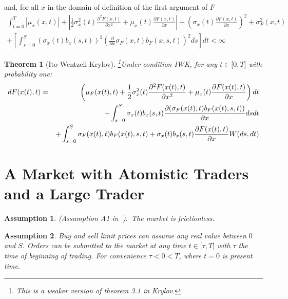 \documentclass{article}
\newtheorem{theorem}{Theorem}[section]
\newtheorem{assumption}{Assumption}
\begin{document}
\qquad and, for all $x$ in the domain of definition of the first argument of
$F$%
\begin{gather*}
\int_{t=0}^{T}|\mu _{x}(x,t)|+\left|\frac{1}{2}\sigma _{x}^{2}(t)\frac{\partial
^{2}F(x,t)}{\partial x^{2}}+\mu _{x}(t)\frac{\partial F(x,t)}{\partial x}%
\right|+\left( \sigma _{x}(t)\frac{\partial F(x,t)}{\partial x}\right) ^{2}+\sigma
_{F}^{2}(x,t) \\
+\left[\int_{s=0}^{S}(\sigma_{x}(t)b_{x}(s,t))^{2}\left(\frac{\partial }{\partial x}%
\sigma _{F}(x,t)b_{F}(x,s,t)\right)^{2}ds\right]dt<\infty
\end{gather*}


\begin{theorem}[Ito-Wentzell-Krylov]
\footnote{%
This is a weaker version of theorem 3.1 in Krylov.}Under condition IWK, for
any $t\in \lbrack 0,T]$ with probability one:%
\begin{eqnarray}
dF(x(t),t) &=&\left( \mu _{F}(x(t),t)+\frac{1}{2}\sigma _{x}^{2}(t)\frac{%
\partial ^{2}F(x(t),t)}{\partial x^{2}}+\mu _{x}(t)\frac{\partial F(x(t),t)}{%
\partial x}\right) dt  \label{ItoWentzell} \\
&&+\int_{s=0}^{S}\sigma _{x}(t)b_{x}(s,t)\frac{\partial (\sigma
_{F}(x(t),t)b_{F}(x(t),s,t))}{\partial x}dsdt  \notag \\
&&+\int_{s=0}^{S}\sigma _{F}(x(t),t)b_{F}(x(t),s,t)+\sigma _{x}(t)b_{x}(s,t)%
\frac{\partial F(x(t),t)}{\partial x}W(ds,dt)  \notag
\end{eqnarray}
\end{theorem}

\section{A Market with Atomistic Traders and a Large Trader}


\begin{assumption}
\label{ass::market_frictionless} (Assumption A1 in\textbf{\ }\cite{Jar92}).\
The market is frictionless.
\end{assumption}



\begin{assumption}
Buy and sell limit prices can assume any real value between $0$ and $S$.
Orders can be submitted to the market at any time $t\in \mathbb{[\tau },T]$
with $\tau $ the time of beginning of trading. For convenience $\tau <0<T$,
where $t=0$ is present time.
\end{assumption}
\end{document}
